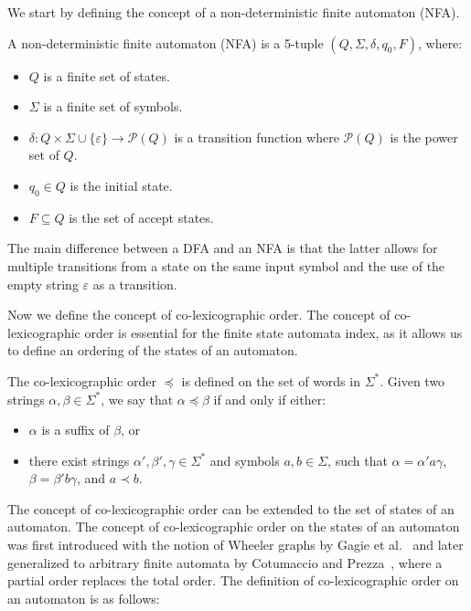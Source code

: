We start by defining the concept of a non-deterministic finite automaton (NFA). 
\begin{definition}
    A non-deterministic finite automaton (NFA) is a 5-tuple $(Q, \Sigma, \delta, q_0, F)$, where:
    \begin{itemize}[leftmargin=25pt]
        \item $Q$ is a finite set of states.
        \item $\Sigma$ is a finite set of symbols.
        \item $\delta: Q \times \Sigma \cup \{\varepsilon\} \to \mathcal{P}(Q)$ is a transition function where $\mathcal{P}(Q)$ is the power set of $Q$.
        \item $q_0 \in Q$ is the initial state.
        \item $F \subseteq Q$ is the set of accept states.
    \end{itemize}
\end{definition}
The main difference between a DFA and an NFA is that the latter allows for multiple transitions from a state on the same input symbol and the use of the empty string $\varepsilon$ as a transition.

Now we define the concept of co-lexicographic order. The concept of co-lexicographic order is essential for the finite state automata index, as it allows us to define an ordering of the states of an automaton. 
\begin{definition} 
    The co-lexicographic order $\preceq$ is defined on the set of words in $\Sigma^*$. Given two strings $\alpha, \beta \in \Sigma^*$, we say that $\alpha \preceq \beta$ if and only if either:
    \begin{itemize}[leftmargin=25pt]
        \item $\alpha$ is a suffix of $\beta$, or
        \item there exist strings $\alpha', \beta', \gamma \in \Sigma^*$ and symbols $a, b \in \Sigma$, such that $\alpha = \alpha'a\gamma$, $\beta = \beta'b\gamma$, and $a \prec b$.
    \end{itemize}
\end{definition}
The concept of co-lexicographic order can be extended to the set of states of an automaton. The concept of co-lexicographic order on the states of an automaton was first introduced with the notion of Wheeler graphs by Gagie et al.~\cite{gagie2017wheeler} and later generalized to arbitrary finite automata by Cotumaccio and Prezza~\cite{cotumaccio2021indexing}, where a partial order replaces the total order. The definition of co-lexicographic order on an automaton is as follows:

